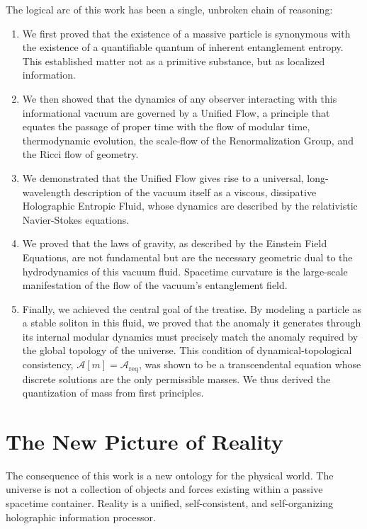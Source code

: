 \documentclass[11pt, letterpaper]{report}
\theoremstyle{plain} %
\theoremstyle{definition} %
\theoremstyle{remark} %
\begin{document}
The logical arc of this work has been a single, unbroken chain of reasoning:
\begin{enumerate}
    \item We first proved that the existence of a massive particle is synonymous with the existence of a quantifiable quantum of inherent entanglement entropy. This established matter not as a primitive substance, but as localized information.
    \item We then showed that the dynamics of any observer interacting with this informational vacuum are governed by a Unified Flow, a principle that equates the passage of proper time with the flow of modular time, thermodynamic evolution, the scale-flow of the Renormalization Group, and the Ricci flow of geometry.
    \item We demonstrated that the Unified Flow gives rise to a universal, long-wavelength description of the vacuum itself as a viscous, dissipative Holographic Entropic Fluid, whose dynamics are described by the relativistic Navier-Stokes equations.
    \item We proved that the laws of gravity, as described by the Einstein Field Equations, are not fundamental but are the necessary geometric dual to the hydrodynamics of this vacuum fluid. Spacetime curvature is the large-scale manifestation of the flow of the vacuum's entanglement field.
    \item Finally, we achieved the central goal of the treatise. By modeling a particle as a stable soliton in this fluid, we proved that the anomaly it generates through its internal modular dynamics must precisely match the anomaly required by the global topology of the universe. This condition of dynamical-topological consistency, $\mathcal{A}[m]=\mathcal{A}_{\text{req}}$, was shown to be a transcendental equation whose discrete solutions are the only permissible masses. We thus derived the quantization of mass from first principles.
\end{enumerate}

\section{The New Picture of Reality}

The consequence of this work is a new ontology for the physical world. The universe is not a collection of objects and forces existing within a passive spacetime container. Reality is a unified, self-consistent, and self-organizing holographic information processor.
\end{document}

